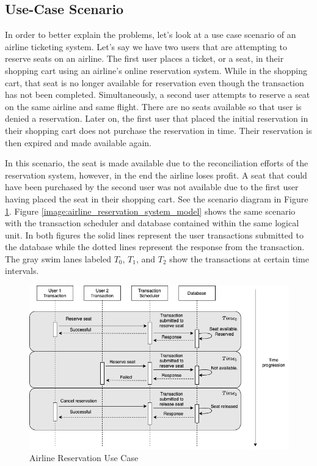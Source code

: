 \subsection{Use-Case Scenario}
\label{subsec:use_case_scenario}

In order to better explain the problems, let's look at a use case scenario of an airline ticketing system. Let's say we have two users that are attempting to reserve seats on an airline. The first user places a ticket, or a seat, in their shopping cart using an airline's online reservation system. While in the shopping cart, that seat is no longer available for reservation even though the transaction has not been completed. Simultaneously, a second user attempts to reserve a seat on the same airline and same flight. There are no seats available so that user is denied a reservation. Later on, the first user that placed the initial reservation in their shopping cart does not purchase the reservation in time. Their reservation is then expired and made available again.

In this scenario, the seat is made available due to the reconciliation efforts of the reservation system, however, in the end the airline loses profit. A seat that could have been purchased by the second user was not available due to the first user having placed the seat in their shopping cart. See the scenario diagram in Figure \ref{image:airline_reservation}. Figure \ref{image:airline_reservation_system_model} shows the same scenario with the transaction scheduler and database contained within the same logical unit. In both figures the solid lines represent the user transactions submitted to the database while the dotted lines represent the response from the transaction. The gray swim lanes labeled $T_0$, $T_1$, and $T_2$ show the transactions at certain time intervals.

\begin{figure}
\centering
\includegraphics[scale=0.50]{images/AirlineReservation.png}
\caption{Airline Reservation Use Case}
\label{image:airline_reservation}
\end{figure}


